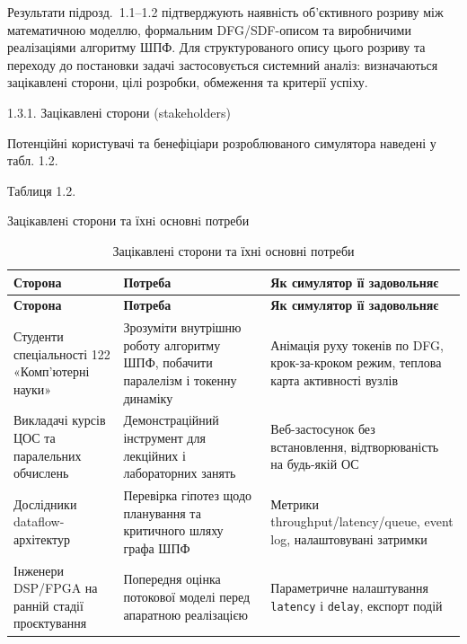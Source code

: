 \documentclass[
]{article}
\begin{document}
Результати підрозд.~1.1--1.2 підтверджують наявність об'єктивного
розриву між математичною моделлю, формальним DFG/SDF-описом та
виробничими реалізаціями алгоритму ШПФ. Для структурованого опису цього
розриву та переходу до постановки задачі застосовується системний
аналіз: визначаються зацікавлені сторони, цілі розробки, обмеження та
критерії успіху.

1.3.1. Зацікавлені сторони (stakeholders)

Потенційні користувачі та бенефіціари розроблюваного симулятора наведені
у табл. 1.2.

Таблиця 1.2.

Зацiкавленi сторони та їхнi основнi потреби

\begin{longtable}[]{@{}
  >{\raggedright\arraybackslash}p{}
  >{\raggedright\arraybackslash}p{}
  >{\raggedright\arraybackslash}p{}@{}}
\caption[Зацікавлені сторони та їхні основні потреби]{Зацікавлені
сторони та їхні основні потреби}\tabularnewline
\toprule\noalign{}
\begin{minipage}[b]{\linewidth}\raggedright
\textbf{Сторона}
\end{minipage} & \begin{minipage}[b]{\linewidth}\raggedright
\textbf{Потреба}
\end{minipage} & \begin{minipage}[b]{\linewidth}\raggedright
\textbf{Як симулятор її задовольняє}
\end{minipage} \\
\midrule\noalign{}
\endfirsthead
\toprule\noalign{}
\begin{minipage}[b]{\linewidth}\raggedright
\textbf{Сторона}
\end{minipage} & \begin{minipage}[b]{\linewidth}\raggedright
\textbf{Потреба}
\end{minipage} & \begin{minipage}[b]{\linewidth}\raggedright
\textbf{Як симулятор її задовольняє}
\end{minipage} \\
\midrule\noalign{}
\endhead
\bottomrule\noalign{}
\endlastfoot
Студенти спеціальності 122 «Комп'ютерні науки» & Зрозуміти внутрішню
роботу алгоритму ШПФ, побачити паралелізм і токенну динаміку & Анімація
руху токенів по DFG, крок-за-кроком режим, теплова карта активності
вузлів \\
Викладачі курсів ЦОС та паралельних обчислень & Демонстраційний
інструмент для лекційних і лабораторних занять & Веб-застосунок без
встановлення, відтворюваність на будь-якій ОС \\
Дослідники dataflow-архітектур & Перевірка гіпотез щодо планування та
критичного шляху графа ШПФ & Метрики throughput/latency/queue, event
log, налаштовувані затримки \\
Інженери DSP/FPGA на ранній стадії проєктування & Попередня оцінка
потокової моделі перед апаратною реалізацією & Параметричне налаштування
\texttt{latency} і \texttt{delay}, експорт подій \\
\end{longtable}
\end{document}
